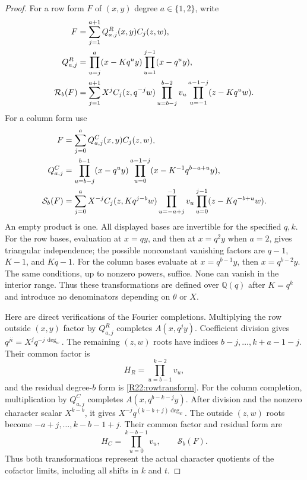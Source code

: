 \begin{proof}
For a row form $F$ of $(x,y)$ degree $a\in\{1,2\}$, write
\begin{align}
 F&=\sum_{j=1}^{a+1}Q^R_{a,j}(x,y)C_j(z,w),\notag\\
 Q^R_{a,j}&=\prod_{u=j}^{a}(x-Kq^uy)
                       \prod_{u=1}^{j-1}(x-q^uy),\label{R22:rowbasis}\\
 \mathcal R_b(F)&=\sum_{j=1}^{a+1}X^j C_j(z,q^{-j}w)
       \prod_{u=b-j}^{b-2}v_u
       \prod_{u=-1}^{a-1-j}(z-Kq^uw).\label{R22:rowtransform}
\end{align}
For a column form use
\begin{align}
 F&=\sum_{j=0}^{a}Q^C_{a,j}(x,y)C_j(z,w),\notag\\
 Q^C_{a,j}&=\prod_{u=b-j}^{b-1}(x-q^uy)
               \prod_{u=0}^{a-1-j}(x-K^{-1}q^{b-a+u}y),
                                                     \label{R22:colbasis}\\
 \mathcal S_b(F)&=\sum_{j=0}^{a}X^{-j}C_j(z,Kq^{j-b}w)
       \prod_{u=-a+j}^{-1}v_u
       \prod_{u=0}^{j-1}(z-Kq^{-b+u}w).\label{R22:coltransform}
\end{align}
An empty product is one. All displayed bases are invertible for the
specified $q,k$. For the row bases, evaluation at $x=qy$, and then
at $x=q^2y$ when $a=2$, gives triangular independence; the possible
nonconstant vanishing factors are $q-1$, $K-1$, and $Kq-1$.
For the column bases evaluate at $x=q^{b-1}y$, then
$x=q^{b-2}y$. The same conditions, up to nonzero powers, suffice.
None can vanish in the interior range. Thus these transformations are
defined over $\mathbb Q(q)$ after $K=q^k$ and introduce no denominators
depending on $\theta$ or $X$.

Here are direct verifications of the Fourier completions.
Multiplying the row outside $(x,y)$ factor by $Q^R_{a,j}$ completes
$A(x,q^jy)$. Coefficient division gives $q^{ji}=X^jq^{-j\,\deg_w}$.
The remaining $(z,w)$ roots have indices $b-j,\ldots,k+a-1-j$.
Their common factor is
\[
 H_R=\prod_{u=b-1}^{k-2}v_u,
\]
and the residual degree-$b$ form is \eqref{R22:rowtransform}.
For the column completion, multiplication by $Q^C_{a,j}$ completes
$A(x,q^{b-k-j}y)$. After division and the nonzero character scalar
$X^{k-b}$, it gives $X^{-j}q^{(k-b+j)\deg_w}$.
The outside $(z,w)$ roots become $-a+j,\ldots,k-b-1+j$.
Their common factor and residual form are
\[
 H_C=\prod_{u=0}^{k-b-1}v_u,
 \qquad \mathcal S_b(F).
\]
Thus both transformations represent the actual character quotients
of the cofactor limits, including all shifts in $k$ and $t$.


\end{proof}
